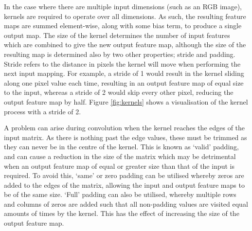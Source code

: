 In the case where there are multiple input dimensions (such as an RGB image), kernels are required to operate over all dimensions. As such, the resulting feature maps are summed element-wise, along with some bias term, to produce a single output map. The size of the kernel determines the number of input features which are combined to give the new output feature map, although the size of the resulting map is determined also by two other properties; stride and padding. Stride refers to the distance in pixels the kernel will move when performing the next input mapping. For example, a stride of 1 would result in the kernel sliding along one pixel value each time, resulting in an output feature map of equal size to the input, whereas a stride of 2 would skip every other pixel, reducing the output feature map by half. Figure \ref{fig:kernels} shows a visualisation of the kernel process with a stride of 2.

A problem can arise during convolution when the kernel reaches the edges of the input matrix. As there is nothing past the edge values, these must be trimmed as they can never be in the centre of the kernel. This is known as `valid' padding, and can cause a reduction in the size of the matrix which may be detrimental when an output feature map of equal or greater size than that of the input is required. To avoid this, `same' or zero padding can be utilised whereby zeros are added to the edges of the matrix, allowing the input and output feature maps to be of the same size. `Full' padding can also be utilised, whereby multiple rows and columns of zeros are added such that all non-padding values are visited equal amounts of times by the kernel. This has the effect of increasing the size of the output feature map.

